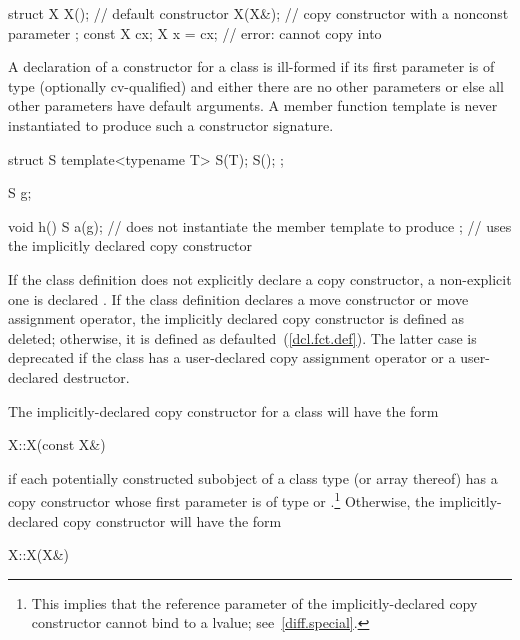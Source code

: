 \begin{codeblock}
struct X {
  X();              // default constructor
  X(X&);            // copy constructor with a nonconst parameter
};
const X cx;
X x = cx;           // error:  cannot copy  into 
\end{codeblock}
\exitexample
\exitnote

\pnum
A declaration of a constructor for a class
is ill-formed if its first parameter is of type (optionally cv-qualified)
and either there are no other parameters or else all other parameters have
default arguments.
A member function template is never instantiated to
produce such a constructor signature.
\enterexample
\begin{codeblock}
struct S {
  template<typename T> S(T);
  S();
};

S g;

void h() {
  S a(g);           // does not instantiate the member template to produce ;
                    // uses the implicitly declared copy constructor
}
\end{codeblock}
\exitexample

\pnum
{}%
If the class definition does not explicitly declare a copy constructor,
a non-explicit one is declared .
If the class definition declares a move
constructor or move assignment operator, the implicitly declared copy
constructor is defined as deleted; otherwise, it is defined as
defaulted~(\ref{dcl.fct.def}).
The latter case is deprecated if the class has a user-declared copy assignment
operator or a user-declared destructor.

\pnum
The implicitly-declared copy constructor for a class
will have the form

\begin{codeblock}
X::X(const X&)
\end{codeblock}

if each potentially constructed subobject of a class type
(or array thereof)
has a copy constructor whose first parameter is of type
or
.\footnote{This implies that the reference parameter of the
implicitly-declared copy constructor
cannot bind to a
lvalue; see~\ref{diff.special}.}
Otherwise, the implicitly-declared copy constructor will have the form

\begin{codeblock}
X::X(X&)
\end{codeblock}

